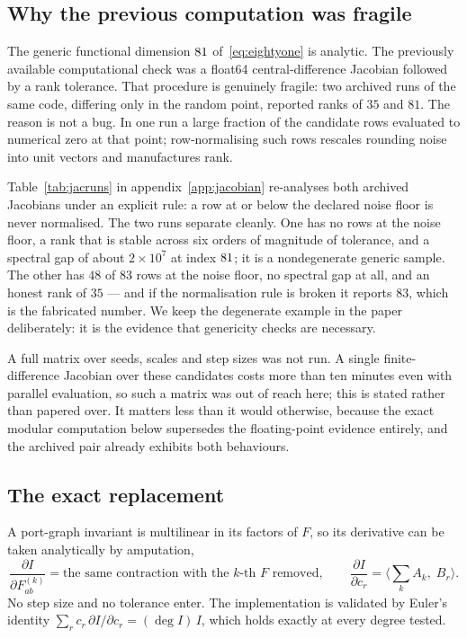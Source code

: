 \documentclass[11pt,a4paper]{article}
\begin{document}
\subsection{Why the previous computation was fragile}

The generic functional dimension $81$
of~\eqref{eq:eightyone} is analytic. The previously available computational check
was a float64 central-difference Jacobian followed by a rank tolerance. That
procedure is genuinely fragile: two archived runs of the same code, differing
only in the random point, reported ranks of $35$ and $81$. The reason is not a
bug. In one run a large fraction of the candidate rows evaluated to numerical
zero at that point; row-normalising such rows rescales rounding noise into unit
vectors and manufactures rank.

Table~\ref{tab:jacruns} in appendix~\ref{app:jacobian} re-analyses both archived
Jacobians under an explicit rule: a row at or below the declared noise floor is
never normalised. The two runs separate cleanly. One has no rows at the noise
floor, a rank that is stable across six orders of magnitude of tolerance, and a
spectral gap of about $2\times 10^{7}$ at index $81$; it is a
nondegenerate generic sample. The other has $48$ of $83$ rows at the noise floor,
no spectral gap at all, and an honest rank of $35$ --- and if the normalisation
rule is broken it reports $83$, which is the fabricated number. We keep the
degenerate example in the paper deliberately: it is the evidence that genericity
checks are necessary.

A full matrix over seeds, scales and step sizes was not run. A single
finite-difference Jacobian over these candidates costs more than ten minutes even
with parallel evaluation, so such a matrix was out of reach here; this is stated
rather than papered over. It matters less than it would otherwise, because the
exact modular computation below supersedes the floating-point evidence entirely,
and the archived pair already exhibits both behaviours.

\subsection{The exact replacement}

A port-graph invariant is multilinear in its factors of $F$, so its derivative
can be taken analytically by amputation,
\begin{equation}
  \frac{\partial I}{\partial F^{(k)}_{ab}}
  = \text{the same contraction with the $k$-th $F$ removed},
  \qquad
  \frac{\partial I}{\partial c_r} = \Big\langle \sum_k A_k,\; B_r \Big\rangle .
\end{equation}
No step size and no tolerance enter. The implementation is validated by Euler's
identity $\sum_r c_r\,\partial I/\partial c_r = (\deg I)\,I$, which holds exactly
at every degree tested.
\end{document}
